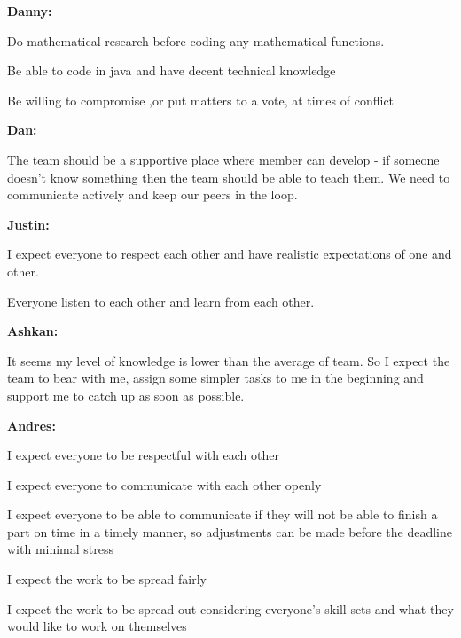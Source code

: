 \documentclass[a4paper, 12pt]{article}
\begin{document}
\textbf{Danny:}
\begin{compactitem}
\item Do mathematical research before coding any mathematical functions.
\item Be able to code in java and have decent technical knowledge 
\item Be willing to compromise ,or put matters to a vote, at times of conflict
\end{compactitem}
\textbf{Dan: }
\begin{compactitem}
\item The team should be a supportive place where member can develop - if someone doesn’t know something then the team should be able to teach them. We need to communicate actively and keep our peers in the loop.
\end{compactitem}
\textbf{Justin:}
\begin{compactitem}
\item I expect everyone to respect each other and have realistic expectations of one and other.
\item Everyone listen to each other and learn from each other.
\end{compactitem}
\textbf{Ashkan:}
\begin{compactitem}
\item It seems my level of knowledge is lower than the average of team. So I expect the team to bear with me, assign some simpler tasks to me in the beginning and support me to catch up as soon as possible.
\end{compactitem}
\textbf{Andres:}
\begin{compactitem}
\item I expect everyone to be respectful with each other
\item I expect everyone to communicate with each other openly
\item I expect everyone to be able to communicate if they will not be able to finish a part on time in a timely manner, so adjustments can be made before the deadline with minimal stress
\item I expect the work to be spread fairly
\item I expect the work to be spread out considering everyone’s skill sets and what they would like to work on themselves
\end{compactitem}
\end{document}
